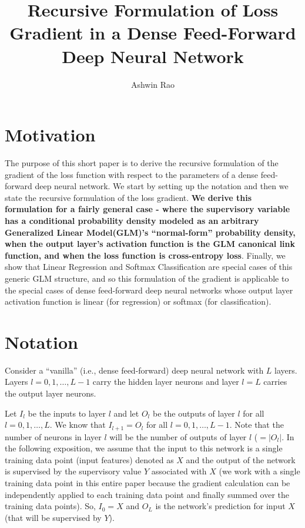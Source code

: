 \documentclass[10pt]{amsart}
\title{Recursive Formulation of Loss Gradient in a Dense Feed-Forward Deep Neural Network}
\author{Ashwin Rao}
\date{} %
\begin{document}
\maketitle

\section{Motivation}
The purpose of this short paper is to derive the recursive formulation of the gradient of the loss function with respect to the parameters of a dense feed-forward deep neural network. We start by setting up the notation and then we state the recursive formulation of the loss gradient. {\bf We derive this formulation for a fairly general case - where the supervisory variable has a conditional probability density modeled as an arbitrary Generalized Linear Model(GLM)'s ``normal-form'' probability density, when the output layer's activation function is the GLM canonical link function, and when the loss function is cross-entropy loss}. Finally, we show that Linear Regression and Softmax Classification are special cases of this generic GLM structure, and so this formulation of the gradient is applicable to the special cases of dense feed-forward deep neural networks whose output layer activation function is linear (for regression) or softmax (for classification).

\section{Notation}

Consider a ``vanilla'' (i.e., dense feed-forward) deep neural network with $L$ layers. Layers $l = 0, 1, \ldots, L - 1$ carry the hidden layer neurons and layer $l = L$ carries the output layer neurons.

Let $I_l$ be the inputs to layer $l$ and let $O_l$ be the outputs of layer $l$ for all $l = 0, 1, \ldots, L$. We know that $I_{l+1} = O_l$ for all $l = 0, 1, \ldots, L - 1$. Note that the number of neurons in layer $l$ will be the number of outputs of layer $l$ ($ = | O_l |$. In the following exposition, we assume that the input to this network is a single training data point (input features) denoted as $X$ and the output of the network is supervised by the supervisory value $Y$ associated with $X$ (we work with a single training data point in this entire paper because the gradient calculation can be independently applied to each training data point and finally summed over the training data points). So, $I_0 = X$ and $O_L$ is the network's prediction for input $X$ (that will be supervised by $Y$). 
\end{document}
